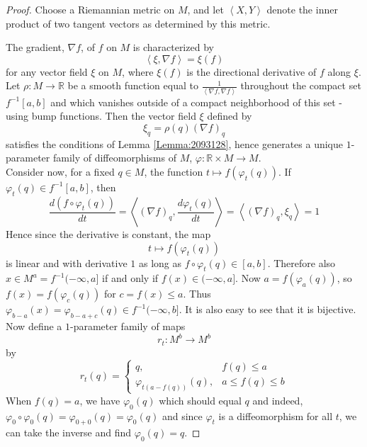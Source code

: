 \documentclass[reqno]{amsart}
\theoremstyle{definition}
\theoremstyle{remark}
\begin{document}
    \begin{proof}
        Choose a Riemannian metric on $M$, and
        let $\left< X, Y \right>$ denote the inner
        product of two tangent vectors as determined
        by this metric.

        The gradient, $\nabla f$, of $f$ on $M$ is characterized
        by
        \[
        \left< \xi, \nabla f \right> = \xi (f)
        \] 
        for any vector field $\xi$ on
        $M$, where $\xi (f)$ is the directional derivative
        of $f$ along $\xi$.\\
        Let
        $\rho \colon M \to \mathbb{R}$ be a smooth
        function equal to
        $\frac{1}{\left< \nabla f, \nabla f \right>}$ throughout
        the compact set $f^{-1}\left[ a,b \right] $ 
        and which vanishes outside of a compact neighborhood
        of this set - using bump functions. Then
         the vector field $\xi$ defined by
         \[
         \xi_{q} = \rho(q) \left( \nabla f \right)_{q}
         \] 
         satisfies the conditions of Lemma \ref{Lemma:2093128},
         hence generates a unique $1$-parameter family
         of diffeomorphisms of $M$, $\varphi  \colon
         \mathbb{R} \times M \to M$.\\

         Consider now, for a fixed $q \in M$, the function
         $t \mapsto f\left( \varphi_t(q) \right) $.
         If $\varphi_t (q) \in f^{-1}\left[ a,b \right] $, then
         \[
         \frac{d \left( f \circ \varphi_t (q) \right) }{dt}
         = \left< (\nabla f)_q , \frac{d \varphi_t(q)}{dt} \right>
         = \left< \left( \nabla f \right)_q, \xi_q  \right>
         = 1
         \] 
         Hence since the derivative is constant,
         the map
         \[
         t \mapsto f\left( \varphi_t(q) \right) 
         \] 
         is linear and with derivative $1$ as
         long as $f \circ \varphi_t(q) \in \left[ a,b \right] $.
         Therefore also
         $x \in M^{a} = f^{-1}(-\infty, a] $ if and only
         if $f(x) \in  (-\infty, a]$. Now
         $a = f \left( \varphi_a(q) \right) $, so
         $f(x) = f \left( \varphi_{c}(q) \right) $ for
         $c = f(x) \le a$.
         Thus $\varphi_{b-a}(x)
         = \varphi_{b-a + c}(q)
         \in f^{-1}(-\infty, b]$. It
         is also easy to see that it is
         bijective.\\
         Now define a $1$-parameter family of maps
         \[
         r_t \colon M^{b} \to M^{b}
         \] 
         by
         \[
         r_t(q) = 
         \begin{cases}
             q,& f(q) \le a\\
             \varphi_{t (a-f(q))}(q),& a \le f(q) \le b
         \end{cases}
         \] 
         When
         $f(q) = a$, we have
         $\varphi_{0}(q)$ which should equal $q$ and indeed,
         $\varphi_{0} \circ \varphi_0 (q) = 
         \varphi_{0+0}(q) = 
         \varphi_{0}(q)$ and since
         $\varphi_t$ is a diffeomorphism for all $t$, we can
         take the inverse and find
         $\varphi_0 (q) = q$.
    \end{proof}
\end{document}
